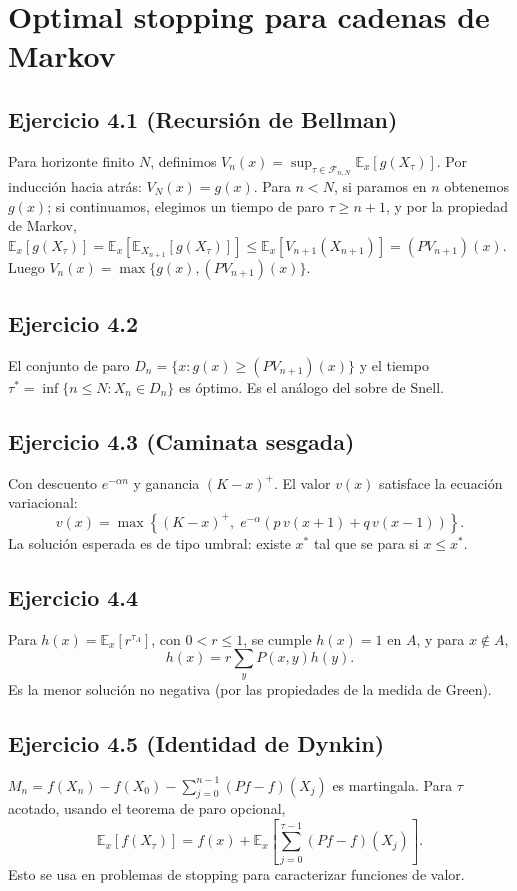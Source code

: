 \documentclass[letterpaper, 12pt]{article}
\newcommand{\E}{\mathbb{E}}
\newcommand{\1}{\mathbbm{1}}
\begin{document}
    \section{Optimal stopping para cadenas de Markov}

    \subsection{Ejercicio 4.1 (Recursi\'on de Bellman)}
    Para horizonte finito $N$, definimos $V_n(x)=\sup_{\tau\in\mathcal{F}_{n,N}}\E_x[g(X_\tau)]$. Por inducci\'on hacia atr\'as: $V_N(x)=g(x)$. Para $n<N$, si paramos en $n$ obtenemos $g(x)$; si continuamos, elegimos un tiempo de paro $\tau\ge n+1$, y por la propiedad de Markov, $\E_x[g(X_\tau)]=\E_x[\E_{X_{n+1}}[g(X_{\tau})]]\le \E_x[V_{n+1}(X_{n+1})]= (PV_{n+1})(x)$. Luego $V_n(x)=\max\{g(x),(PV_{n+1})(x)\}$.

    \subsection{Ejercicio 4.2}
    El conjunto de paro $D_n=\{x:g(x)\ge (PV_{n+1})(x)\}$ y el tiempo $\tau^*=\inf\{n\le N:X_n\in D_n\}$ es \'optimo. Es el an\'alogo del sobre de Snell.

    \subsection{Ejercicio 4.3 (Caminata sesgada)}
    Con descuento $e^{-\alpha n}$ y ganancia $(K-x)^+$. El valor $v(x)$ satisface la ecuaci\'on variacional:
    \[
    v(x)=\max\left\{(K-x)^+,\;e^{-\alpha}(p\,v(x+1)+q\,v(x-1))\right\}.
    \]
    La soluci\'on esperada es de tipo umbral: existe $x^*$ tal que se para si $x\le x^*$.

    \subsection{Ejercicio 4.4}
    Para $h(x)=\E_x[r^{\tau_A}]$, con $0<r\le1$, se cumple $h(x)=1$ en $A$, y para $x\notin A$,
    \[
    h(x)=r\sum_y P(x,y)h(y).
    \]
    Es la menor soluci\'on no negativa (por las propiedades de la medida de Green).

    \subsection{Ejercicio 4.5 (Identidad de Dynkin)}
    $M_n=f(X_n)-f(X_0)-\sum_{j=0}^{n-1}(Pf-f)(X_j)$ es martingala. Para $\tau$ acotado, usando el teorema de paro opcional,
    \[
    \E_x[f(X_\tau)]=f(x)+\E_x\left[\sum_{j=0}^{\tau-1}(Pf-f)(X_j)\right].
    \]
    Esto se usa en problemas de stopping para caracterizar funciones de valor.
\end{document}
